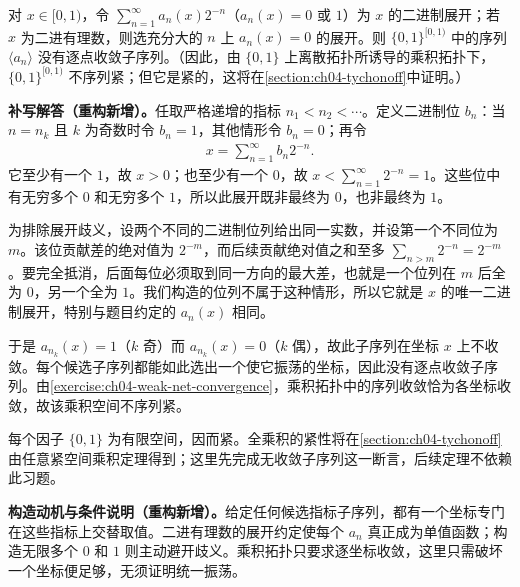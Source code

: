 \documentclass[../../main.tex]{subfiles}%
\begin{document}
\begin{exercise}\label{exercise:ch04-binary-digit-sequence}
对 $x\in[0,1)$，令 $\sum_{n=1}^{\infty}a_n(x)2^{-n}$（$a_n(x)=0$ 或 $1$）为 $x$ 的二进制展开；若 $x$ 为二进有理数，则选充分大的 $n$ 上 $a_n(x)=0$ 的展开。则 $\{0,1\}^{[0,1)}$ 中的序列 $\langle a_n\rangle$ 没有逐点收敛子序列。（因此，由 $\{0,1\}$ 上离散拓扑所诱导的乘积拓扑下，$\{0,1\}^{[0,1)}$ 不序列紧；但它是紧的，这将在\cref{section:ch04-tychonoff}中证明。）
\end{exercise}
\begin{solution}
\textbf{补写解答（重构新增）。}任取严格递增的指标 $n_1<n_2<\cdots$。定义二进制位 $b_n$：当 $n=n_k$ 且 $k$ 为奇数时令 $b_n=1$，其他情形令 $b_n=0$；再令
\begin{align*}
x=\sum_{n=1}^{\infty}b_n2^{-n}.
\end{align*}
它至少有一个 $1$，故 $x>0$；也至少有一个 $0$，故 $x<\sum_{n=1}^{\infty}2^{-n}=1$。这些位中有无穷多个 $0$ 和无穷多个 $1$，所以此展开既非最终为 $0$，也非最终为 $1$。

为排除展开歧义，设两个不同的二进制位列给出同一实数，并设第一个不同位为 $m$。该位贡献差的绝对值为 $2^{-m}$，而后续贡献绝对值之和至多 $\sum_{n>m}2^{-n}=2^{-m}$。要完全抵消，后面每位必须取到同一方向的最大差，也就是一个位列在 $m$ 后全为 $0$，另一个全为 $1$。我们构造的位列不属于这种情形，所以它就是 $x$ 的唯一二进制展开，特别与题目约定的 $a_n(x)$ 相同。

于是 $a_{n_k}(x)=1$（$k$ 奇）而 $a_{n_k}(x)=0$（$k$ 偶），故此子序列在坐标 $x$ 上不收敛。每个候选子序列都能如此选出一个使它振荡的坐标，因此没有逐点收敛子序列。由\cref{exercise:ch04-weak-net-convergence}，乘积拓扑中的序列收敛恰为各坐标收敛，故该乘积空间不序列紧。

每个因子 $\{0,1\}$ 为有限空间，因而紧。全乘积的紧性将在\cref{section:ch04-tychonoff}由任意紧空间乘积定理得到；这里先完成无收敛子序列这一断言，后续定理不依赖此习题。
\end{solution}
\begin{remark}
\textbf{构造动机与条件说明（重构新增）。}给定任何候选指标子序列，都有一个坐标专门在这些指标上交替取值。二进有理数的展开约定使每个 $a_n$ 真正成为单值函数；构造无限多个 $0$ 和 $1$ 则主动避开歧义。乘积拓扑只要求逐坐标收敛，这里只需破坏一个坐标便足够，无须证明统一振荡。
\end{remark}
\end{document}
